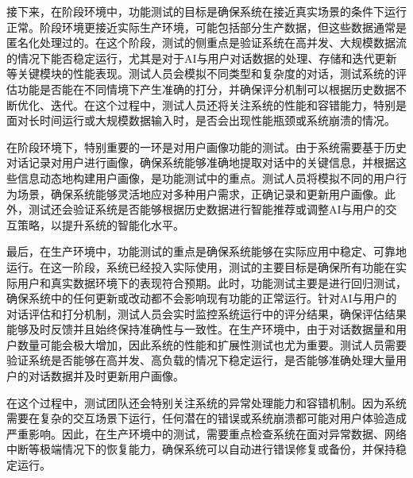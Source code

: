 接下来，在阶段环境中，功能测试的目标是确保系统在接近真实场景的条件下运行正常。阶段环境更接近实际生产环境，可能包括部分生产数据，但这些数据通常是匿名化处理过的。在这个阶段，测试的侧重点是验证系统在高并发、大规模数据流的情况下能否稳定运行，尤其是对于AI与用户对话数据的处理、存储和迭代更新等关键模块的性能表现。测试人员会模拟不同类型和复杂度的对话，测试系统的评估功能是否能在不同情境下产生准确的打分，并确保评分机制可以根据历史数据不断优化、迭代。在这个过程中，测试人员还将关注系统的性能和容错能力，特别是面对长时间运行或大规模数据输入时，是否会出现性能瓶颈或系统崩溃的情况。

在阶段环境下，特别重要的一环是对用户画像功能的测试。由于系统需要基于历史对话记录对用户进行画像，确保系统能够准确地提取对话中的关键信息，并根据这些信息动态地构建用户画像，是功能测试中的重点。测试人员将模拟不同的用户行为场景，确保系统能够灵活地应对多种用户需求，正确记录和更新用户画像。此外，测试还会验证系统是否能够根据历史数据进行智能推荐或调整AI与用户的交互策略，以提升系统的智能化水平。

最后，在生产环境中，功能测试的重点是确保系统能够在实际应用中稳定、可靠地运行。在这一阶段，系统已经投入实际使用，测试的主要目标是确保所有功能在实际用户和真实数据环境下的表现符合预期。此时，功能测试主要是进行回归测试，确保系统中的任何更新或改动都不会影响现有功能的正常运行。针对AI与用户的对话评估和打分机制，测试人员会实时监控系统运行中的评分结果，确保评估结果能够及时反馈并且始终保持准确性与一致性。在生产环境中，由于对话数据量和用户数量可能会极大增加，因此系统的性能和扩展性测试也尤为重要。测试人员需要验证系统是否能够在高并发、高负载的情况下稳定运行，是否能够准确处理大量用户的对话数据并及时更新用户画像。

在这个过程中，测试团队还会特别关注系统的异常处理能力和容错机制。因为系统需要在复杂的交互场景下运行，任何潜在的错误或系统崩溃都可能对用户体验造成严重影响。因此，在生产环境中的测试，需要重点检查系统在面对异常数据、网络中断等极端情况下的恢复能力，确保系统可以自动进行错误修复或备份，并保持稳定运行。
